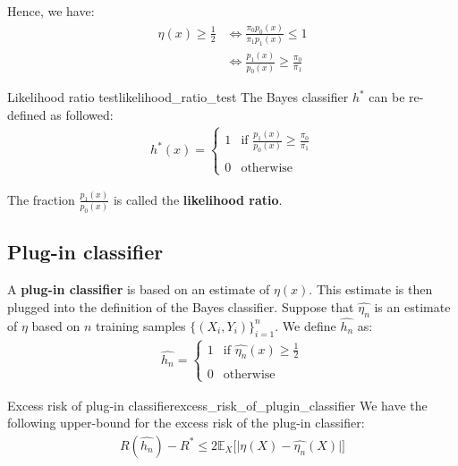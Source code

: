 \noindent\newline Hence, we have:
\begin{align*}
    \eta(x) \ge \frac{1}{2} &\iff \frac{\pi_0p_0(x)}{\pi_1p_1(x)} \le 1 \\
        &\iff \frac{p_1(x)}{p_0(x)} \ge \frac{\pi_0}{\pi_1}
\end{align*}

\begin{proposition}{Likelihood ratio test}{likelihood_ratio_test}
    The Bayes classifier $h^*$ can be re-defined as followed:
    \begin{align*}
        h^*(x) = \begin{cases}
            1 & \text{if } \frac{p_1(x)}{p_0(x)} \ge \frac{\pi_0}{\pi_1}
            \\ \\
            0 & \text{otherwise}
        \end{cases}
    \end{align*}

    \noindent The fraction $\frac{p_1(x)}{p_0(x)}$ is called the \textbf{likelihood ratio}.
\end{proposition}


\subsection{Plug-in classifier}
\begin{definition}
    A \textbf{plug-in classifier} is based on an estimate of $\eta(x)$. This estimate is then plugged into the definition of the Bayes classifier. Suppose that $\widehat{\eta_n}$ is an estimate of $\eta$ based on $n$ training samples $\{(X_i, Y_i)\}_{i=1}^n$. We define $\widehat{h_n}$ as:
    \begin{align*}
        \widehat{h_n} = \begin{cases}
            1 & \text{if } \widehat{\eta_n}(x) \ge \frac{1}{2}
            \\ \\
            0 & \text{otherwise}
        \end{cases}
    \end{align*}
\end{definition}

\begin{corollary}{Excess risk of plug-in classifier}{excess_risk_of_plugin_classifier}
    We have the following upper-bound for the excess risk of the plug-in classifier:
    \begin{align*}
        R(\widehat{h_n}) - R^* \le 2 \mathbb{E}_X\Big[ \Big| \eta(X) - \widehat{\eta_n}(X) \Big| \Big]
    \end{align*}
\end{corollary}

